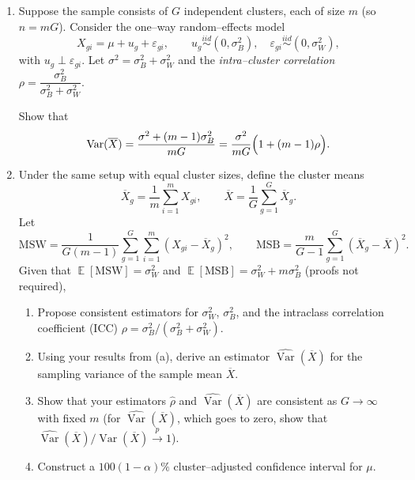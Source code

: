 \documentclass[12pt]{article}
\newcommand{\Var}{\operatorname{Var}}
\newcommand{\E}{\operatorname{\mathbb{E}}}
\begin{document}
\begin{enumerate}\itemsep1em
\item Suppose the sample consists of $G$ independent clusters, each of size $m$ (so $n=mG$). Consider the one–way random–effects model
\[
X_{gi}=\mu+u_g+\varepsilon_{gi},\qquad u_g\stackrel{iid}{\sim}(0,\sigma_B^2),\quad \varepsilon_{gi}\stackrel{iid}{\sim}(0,\sigma_W^2),
\]
with $u_g\perp \varepsilon_{gi}$. Let $\sigma^2=\sigma_B^2+\sigma_W^2$ and the \emph{intra–cluster correlation} $\rho=\dfrac{\sigma_B^2}{\sigma_B^2+\sigma_W^2}$.

Show that
\[
\Var(\overline{X}) = \frac{\sigma^2+(m-1)\sigma_B^2}{mG}
= \frac{\sigma^2}{mG}\Bigl(1+(m-1)\rho\Bigr).
\]
\clearpage

\item Under the same setup with equal cluster sizes, define the cluster means 
\[
\overline{X}_g=\frac{1}{m}\sum_{i=1}^m X_{gi},\qquad 
\overline{X}=\frac{1}{G}\sum_{g=1}^G\overline{X}_g.
\]
Let
\[
\text{MSW}=\frac{1}{G(m-1)}\sum_{g=1}^G\sum_{i=1}^m (X_{gi}-\overline{X}_g)^2,\qquad
\text{MSB}=\frac{m}{G-1}\sum_{g=1}^G(\overline{X}_g-\overline{X})^2.
\]
Given that $\E[\text{MSW}]=\sigma_W^2$ and $\E[\text{MSB}]=\sigma_W^2+m\sigma_B^2$ (proofs not required),

\begin{enumerate}
\item[(a)] Propose consistent estimators for $\sigma_W^2$, $\sigma_B^2$, and the intraclass correlation coefficient (ICC) $\rho=\sigma_B^2/(\sigma_B^2+\sigma_W^2)$.
\item[(b)] Using your results from (a), derive an estimator $\widehat{\Var}(\overline{X})$ for the sampling variance of the sample mean $\overline{X}$.
\item[(c)] Show that your estimators $\widehat{\rho}$ and $\widehat{\Var}(\overline{X})$ are consistent as $G\to\infty$ with fixed $m$ (for $\widehat{\Var}(\overline{X})$, which goes to zero, show that $\widehat{\Var}(\overline{X})/\Var(\overline{X})\xrightarrow{p}1$).
\item[(d)] Construct a $100(1-\alpha)\%$ cluster–adjusted confidence interval for $\mu$.
\end{enumerate}

\end{enumerate}
\end{document}
